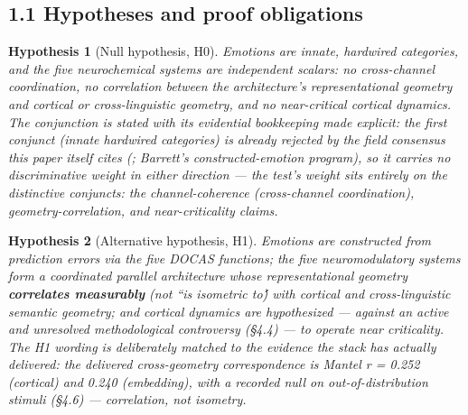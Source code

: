 \documentclass[
]{article}
\begin{document}
\subsection{1.1 Hypotheses and proof
obligations}\label{hypotheses-and-proof-obligations}

\textbf{Hypothesis 1} (Null hypothesis, H0). \emph{Emotions are innate,
hardwired categories, and the five neurochemical systems are independent
scalars: no cross-channel coordination, no correlation between the
architecture's representational geometry and cortical or
cross-linguistic geometry, and no near-critical cortical dynamics. The
conjunction is stated with its evidential bookkeeping made explicit: the
first conjunct (innate hardwired categories) is already rejected by the
field consensus this paper itself cites (; Barrett's constructed-emotion
program), so it carries no discriminative weight in either direction ---
the test's weight sits entirely on the distinctive conjuncts: the
channel-coherence (cross-channel coordination), geometry-correlation,
and near-criticality claims.}

\textbf{Hypothesis 2} (Alternative hypothesis, H1). \emph{Emotions are
constructed from prediction errors via the five DOCAS functions; the
five neuromodulatory systems form a coordinated parallel architecture
whose representational geometry \textbf{correlates measurably} (not ``is
isometric to)́́ with cortical and cross-linguistic semantic geometry; and
cortical dynamics are hypothesized --- against an active and unresolved
methodological controversy (§4.4) --- to operate near criticality. The
H1 wording is deliberately matched to the evidence the stack has
actually delivered: the delivered cross-geometry correspondence is
Mantel r = 0.252 (cortical) and 0.240 (embedding), with a recorded null
on out-of-distribution stimuli (§4.6) --- correlation, not isometry.}
\end{document}
